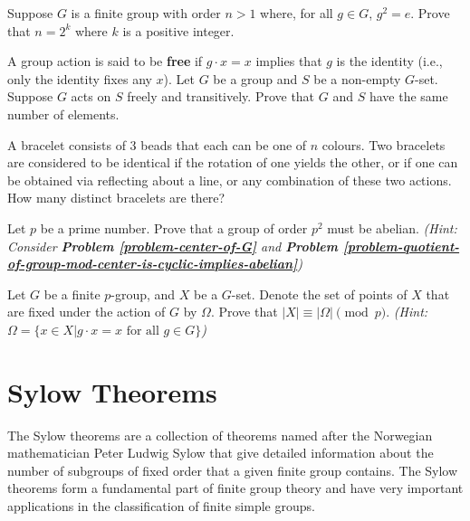 \begin{problem}
    Suppose $G$ is a finite group with order $n > 1$ where, for all $g \in G$, $g^2 = e$. Prove that $n = 2^k$ where $k$ is a positive integer.
\end{problem}

\begin{problem}
    A group action is said to be \textbf{free} if $g\cdot x = x$ implies that $g$ is the identity (i.e., only the identity fixes any $x$).\newline
    Let $G$ be a group and $S$ be a non-empty $G$-set. Suppose $G$ acts on $S$ freely and transitively. Prove that $G$ and $S$ have the same number of elements.
\end{problem}

\begin{problem}
    A bracelet consists of 3 beads that each can be one of $n$ colours. Two bracelets are considered to be identical if the rotation of one yields the other, or if one can be obtained via reflecting about a line, or any combination of these two actions. How many distinct bracelets are there?
\end{problem}

\begin{problem}\label{problem-group-of-order-prime-squared-is-abelian}
    Let $p$ be a prime number. Prove that a group of order $p^2$ must be abelian.\newline
    \textit{(Hint: Consider \textbf{Problem \ref{problem-center-of-G}} and \textbf{Problem \ref{problem-quotient-of-group-mod-center-is-cyclic-implies-abelian}})}
\end{problem}

\begin{problem}\label{problem-order-of-G-set-equiv-order-of-fixed-points}
    Let $G$ be a finite $p$-group, and $X$ be a $G$-set. Denote the set of points of $X$ that are fixed under the action of $G$ by $\Omega$. Prove that $|X| \equiv |\Omega| \pmod p$.\newline
    \textit{(Hint: $\Omega = \{x \in X \vert g\cdot x = x \textrm{ for all } g \in G\}$)}
\end{problem}

\chapter{Sylow Theorems}
The Sylow theorems are a collection of theorems named after the Norwegian mathematician Peter Ludwig Sylow that give detailed information about the number of subgroups of fixed order that a given finite group contains. The Sylow theorems form a fundamental part of finite group theory and have very important applications in the classification of finite simple groups.

